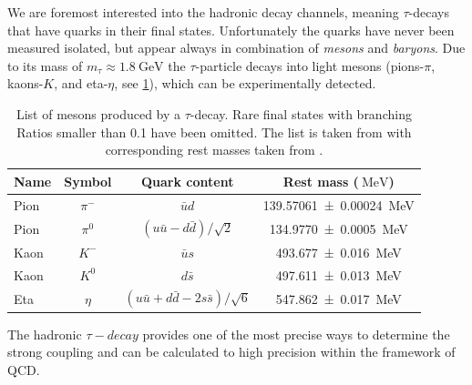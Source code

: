 \documentclass[../../index.tex]{subfiles}
\begin{document}
We are foremost interested into the hadronic decay channels, meaning
$\tau$-decays that have quarks in their final states. Unfortunately the quarks
have never been measured isolated, but appear always in combination of \textit{mesons}
and \textit{baryons}. Due to its mass of $m_\tau \approx
\SI{1.8}{\giga\electronvolt}$ the $\tau$-particle decays into light mesons
(pions-$\pi$, kaons-$K$, and eta-$\eta$, see \cref{table:lightMesons}), which
can be experimentally detected.
\begin{table}
  \label{table:lightMesons}
  \centering
  \begin{tabular}{l c c c}
    \toprule
    Name & Symbol & Quark content & Rest mass ($\SI{}{\mega\electronvolt}$) \\
    \midrule
    Pion & $\pi^-$ & $\bar u d$ & \SI{139.57061 \pm 0.00024}{\mega\electronvolt}  \\
    Pion & $\pi^0$ & $(u \bar u - d \bar d)/\sqrt{2}$ & \SI{134.9770\pm0.0005}{\mega\electronvolt} \\
    Kaon & $K^-$ & $\bar u s$ & \SI{493.677\pm0.016}{\mega\electronvolt} \\
    Kaon & $K^0$ & $d \bar s$ & \SI{497.611\pm0.013}{\mega\electronvolt} \\
    Eta & $\eta$ & $(u \bar u + d \bar d - 2 s \bar s)/\sqrt{6}$ & \SI{547.862\pm0.017}{\mega\electronvolt} \\
  \end{tabular}
  \caption{List of mesons produced by a $\tau$-decay. Rare final states with
    branching Ratios smaller than 0.1 have been omitted. The list is taken from 
    \cite{Davier2006} with corresponding rest masses taken from \cite{PDG2018}.}
\end{table}

The hadronic $\tau-decay$ provides one of the most precise ways to determine the
strong coupling \cite{Pich2016} and can be calculated to high precision within
the framework of QCD.
\end{document}
